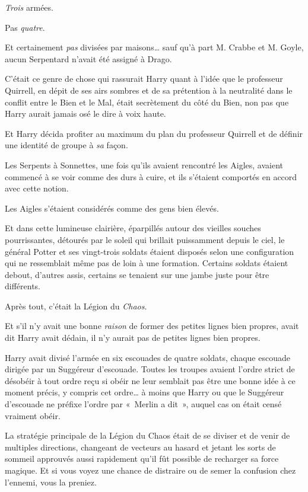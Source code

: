 \emph{Trois} armées.

Pas \emph{quatre}.

Et certainement \emph{pas} divisées par maisons… sauf qu'à part M. Crabbe et M. Goyle, aucun Serpentard n'avait été assigné à Drago.

C'était ce genre de chose qui rassurait Harry quant à l'idée que le professeur Quirrell, en dépit de ses airs sombres et de sa prétention à la neutralité dans le conflit entre le Bien et le Mal, était secrètement du côté du Bien, non pas que Harry aurait jamais osé le dire à voix haute.

Et Harry décida profiter au maximum du plan du professeur Quirrell et de définir une identité de groupe à \emph{sa} façon.

Les Serpents à Sonnettes, une fois qu'ils avaient rencontré les Aigles, avaient commencé à se voir comme des durs à cuire, et ils s'étaient comportés en accord avec cette notion.

Les Aigles s'étaient considérés comme des gens bien élevés.

Et dans cette lumineuse clairière, éparpillés autour des vieilles souches pourrissantes, détourés par le soleil qui brillait puissamment depuis le ciel, le général Potter et ses vingt-trois soldats étaient disposés selon une configuration qui ne ressemblait même pas de loin à une formation. Certains soldats étaient debout, d'autres assis, certains se tenaient sur une jambe juste pour être différents.

Après tout, c'était la Légion du \emph{Chaos}.

Et s'il n'y avait une bonne \emph{raison} de former des petites lignes bien propres, avait dit Harry avait dédain, il n'y aurait pas de petites lignes bien propres.

Harry avait divisé l'armée en six escouades de quatre soldats, chaque escouade dirigée par un Suggéreur d'escouade. Toutes les troupes avaient l'ordre strict de désobéir à tout ordre reçu si obéir ne leur semblait pas être une bonne idée à ce moment précis, y compris cet ordre… à moins que Harry ou que le Suggéreur d'escouade ne préfixe l'ordre par «~Merlin a dit~», auquel cas on était censé vraiment obéir.

La stratégie principale de la Légion du Chaos était de se diviser et de venir de multiples directions, changeant de vecteurs au hasard et jetant les sorts de sommeil approuvés aussi rapidement qu'il fût possible de recharger sa force magique. Et si vous voyez une chance de distraire ou de semer la confusion chez l'ennemi, vous la preniez.

